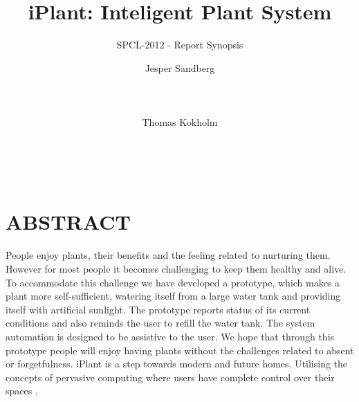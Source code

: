 \documentclass{ubicomp2012}
\begin{document}
\setlength{\paperheight}{11in}
\setlength{\paperwidth}{8.5in}
\setlength{\pdfpageheight}{\paperheight}
\setlength{\pdfpagewidth}{\paperwidth}


\title{iPlant: Inteligent Plant System}
\subtitle{SPCL-2012 - Report Synopsis}
\author{
  \alignauthor Jesper Sandberg\\
    \\
    \\
    \\
 \alignauthor Thomas Kokholm\\
    \\
    \\
    \\
      }
\maketitle

\section{ABSTRACT}
People enjoy plants, their benefits and the feeling related to nurturing them. However for most people it becomes challenging to keep them healthy and alive. To accommodate this challenge we have developed a prototype, which makes a plant more self-sufficient, watering itself from a large water tank and providing itself with artificial sunlight.
The prototype reports status of its current conditions and also reminds the user to refill the water tank. The system automation is designed to be assistive to the user. We hope that through this prototype people will enjoy having plants without the challenges related to absent or forgetfulness.
iPlant is a step towards modern and future homes. Utilising the concepts of pervasive computing where users have complete control over their spaces \cite{future-homes}.
\end{document}
